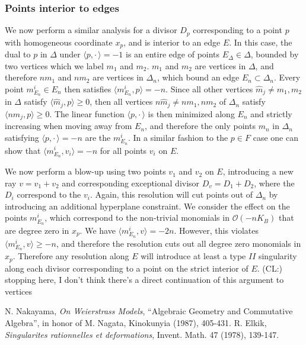 \documentclass[aps,prl,twocolumn, superscriptaddress,groupedaddress,nofootinbib]{revtex4}
\newcommand{\cl}[1]{{\color{red}(CL:) #1}}
\begin{document}
\subsubsection{Points interior to edges}
We now perform a similar analysis for a divisor $D_p$ corresponding to a point $p$ with homogeneous coordinate $x_p$, and is interior to an edge $E$. In this case, the dual to $p$ in $\Delta$ under $\langle p, \cdot \, \rangle = -1$ is an entire edge of points $E_\Delta \in \Delta$, bounded by two vertices which we label $m_1$ and $m_2$. $m_1$ and $m_2$ are vertices in $\Delta$, and therefore $n m_1$ and $n m_2$ are vertices in $\Delta_n$, which bound an edge $E_{n} \subset \Delta_n$. Every point $m^i_{E_n} \in E_{n}$ then satisfies $\langle m^i_{E_n} , p \rangle = -n$. Since all other vertices $\hat{m}_j \neq m_1, m_2$ in $\Delta$ satisfy $\langle \hat{m}_j, p\rangle \geq 0$, then all vertices $n \hat{m}_j \neq n m_1, n m_2$ of $\Delta_n$ satisfy $\langle n \hat{m}_j, p\rangle \geq 0$. The linear function $\langle p, \cdot \, \rangle$ is then minimized along $E_n$ and strictly increasing when moving away from $E_n$, and therefore the only points $m_n$ in $\Delta_n$ satisfying $ \langle p, \cdot \, \rangle = -n$ are the $m^i_{E_n}$. In a similar fashion to the $p \in F$ case one can show that $\langle m^i_{E_n}, v_i \rangle = -n$ for all points $v_i$ on $E$. 

We now perform a blow-up using two points $v_1$ and $v_2$ on $E$, introducing a new ray $v = v_1 + v_2$ and corresponding exceptional divisor $D_v = D_1 +D_2$, where the $D_i$ correspond to the $v_i$. Again, this resolution will cut points out of $\Delta_n$ by introducing an additional hyperplane constraint. We consider the effect on the points $m^i_{E_n}$, which correspond to the non-trivial monomials in $\mathcal{O}(-n K_B)$ that are degree zero in $x_p$. We have $\langle m^i_{E_n}, v \rangle = -2 n$. However, this violates $\langle m^i_{E_n}, v \rangle \geq -n$, and therefore the resolution cuts out all degree zero monomials in $x_p$. Therefore any resolution along $E$ will introduce at least a type $II$ singularity along each divisor corresponding to a point on the strict interior of $E$. \cl{stopping here, I don't think there's a direct continuation of this argument to vertices}


\renewcommand{\section}[2]{}%
 \begin{thebibliography}{}
 \begingroup
    \fontsize{10pt}{12pt}\selectfont
{} N. Nakayama, \textit{On Weierstrass Models}, ``Algebraic Geometry and Commutative Algebra'', in honor of M. Nagata, Kinokunyia (1987), 405-431.
\vskip 0cm
 R. Elkik, \textit{Singularites rationnelles et deformations}, Invent. Math. 47 (1978), 139-147.
\vskip 0cm
  \endgroup
  \end{thebibliography}
\end{document}
